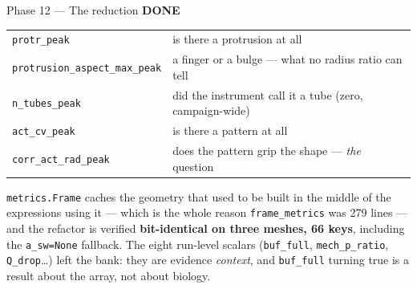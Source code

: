 \documentclass[11pt,a4paper]{article}
\newcommand{\code}[1]{\texttt{#1}}
\newcommand{\done}{\textcolor{good}{\textbf{DONE}}}
\begin{document}
\begin{phasebox}{Phase 12 --- The reduction \hfill \done}
\begin{center}\small
\begin{tabular}{ll}
\toprule
\code{protr\_peak}                  & is there a protrusion at all \\
\code{protrusion\_aspect\_max\_peak}& a finger or a bulge --- what no radius ratio can tell \\
\code{n\_tubes\_peak}               & did the instrument call it a tube (zero, campaign-wide) \\
\code{act\_cv\_peak}                & is there a pattern at all \\
\code{corr\_act\_rad\_peak}         & does the pattern grip the shape --- \emph{the} question \\
\bottomrule
\end{tabular}
\end{center}

\noindent \code{metrics.Frame} caches the geometry that used to be built in the middle of the
expressions using it --- which is the whole reason \code{frame\_metrics} was 279 lines --- and the
refactor is verified \textbf{bit-identical on three meshes, 66 keys}, including the \code{a\_sw=None}
fallback. The eight run-level scalars (\code{buf\_full}, \code{mech\_p\_ratio}, \code{Q\_drop}\dots)
left the bank: they are evidence \emph{context}, and \code{buf\_full} turning true is a result about
the array, not about biology.


\end{phasebox}
\end{document}
